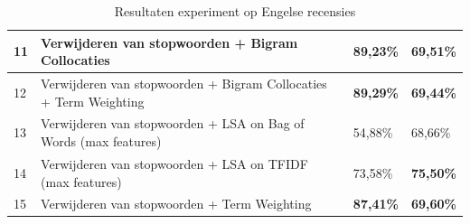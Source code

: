 \begin{table}[h]
\begin{adjustbox}{width=1\textwidth}
\begin{tabular}{|l|l|l|l|}
11       & Verwijderen van stopwoorden + Bigram Collocaties                                    & {\bf 89,23\%}                           & {\bf 69,51\%}                  \\ \hline
12       & Verwijderen van stopwoorden + Bigram Collocaties + Term Weighting                   & {\bf 89,29\%}                           & {\bf 69,44\%}                  \\ \hline
13       & Verwijderen van stopwoorden + LSA on Bag of Words (max features)                    & 54,88\%                                 & 68,66\%                        \\ \hline
14       & Verwijderen van stopwoorden + LSA on TFIDF (max features)                           & 73,58\%                                 & {\bf 75,50\%}                  \\ \hline
15       & Verwijderen van stopwoorden + Term Weighting                                        & {\bf 87,41\%}                           & {\bf 69,60\%}                  \\ \hline
\end{tabular}
\end{adjustbox}
\label{tabel: resultaten engelse gevoelsanalyse}
\caption{Resultaten experiment op Engelse recensies}
\end{table}

